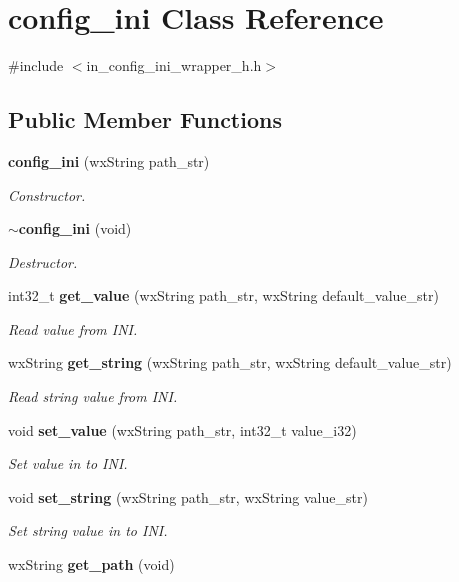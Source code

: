\section{config\+\_\+ini Class Reference}
\label{classconfig__ini}


{\ttfamily \#include $<$in\+\_\+config\+\_\+ini\+\_\+wrapper\+\_\+h.\+h$>$}

\subsection*{Public Member Functions}
\begin{DoxyCompactItemize}
\item 
\textbf{ config\+\_\+ini} (wx\+String path\+\_\+str)
\begin{DoxyCompactList}\small\item\em Constructor. \end{DoxyCompactList}\item 
\textbf{ $\sim$config\+\_\+ini} (void)
\begin{DoxyCompactList}\small\item\em Destructor. \end{DoxyCompactList}\item 
int32\+\_\+t \textbf{ get\+\_\+value} (wx\+String path\+\_\+str, wx\+String default\+\_\+value\+\_\+str)
\begin{DoxyCompactList}\small\item\em Read value from I\+NI. \end{DoxyCompactList}\item 
wx\+String \textbf{ get\+\_\+string} (wx\+String path\+\_\+str, wx\+String default\+\_\+value\+\_\+str)
\begin{DoxyCompactList}\small\item\em Read string value from I\+NI. \end{DoxyCompactList}\item 
void \textbf{ set\+\_\+value} (wx\+String path\+\_\+str, int32\+\_\+t value\+\_\+i32)
\begin{DoxyCompactList}\small\item\em Set value in to I\+NI. \end{DoxyCompactList}\item 
void \textbf{ set\+\_\+string} (wx\+String path\+\_\+str, wx\+String value\+\_\+str)
\begin{DoxyCompactList}\small\item\em Set string value in to I\+NI. \end{DoxyCompactList}\item 
\mbox{\label{classconfig__ini_ab4b25af8f5e58adf9d0ec95f476d3050}} 
wx\+String {\bfseries get\+\_\+path} (void)
\end{DoxyCompactItemize}
